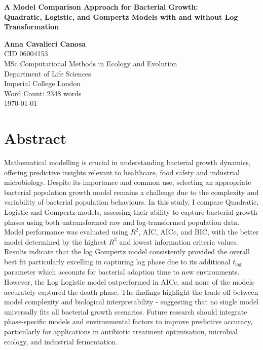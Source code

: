 \documentclass[11pt]{article}
\begin{document}
\begin{titlepage}
    \centering
    \vspace*{0.3in}
    \begin{spacing}{3}
         {\LARGE \bf 
    A Model Comparison Approach for Bacterial Growth: \\ Quadratic, Logistic, and Gompertz Models with and without Log Transformation}\\[0.5in]
    \end{spacing}
    
    \textbf{Anna Cavalieri Canosa}\\
    CID 06004153\\[1in] 
    MSc Computational Methods in Ecology and Evolution\\
    Department of Life Sciences\\
    Imperial College London\\[1in]
    Word Count: 2348 words\\[1in]
    \today
\end{titlepage}

\section*{Abstract}
Mathematical modelling is crucial in understanding bacterial growth dynamics, offering predictive insights relevant to healthcare, food safety and industrial microbiology. Despite its importance and common use, selecting an appropriate bacterial population growth model remains a challenge due to the complexity and variability of bacterial population behaviours. In this study, I compare Quadratic, Logistic and Gompertz models, assessing their ability to capture bacterial growth phases using both untransformed raw and log-transformed population data. Model performance was evaluated using $R^2$, AIC, AICc, and BIC, with the better model determined by the highest $R^2$ and lowest information criteria values. Results indicate that the log Gompertz model consistently provided the overall best fit particularly excelling in capturing lag phase due to its additional $t_{\text{lag}}$ parameter which accounts for bacterial adaption time to new environments. However, the Log Logistic model outperformed in AICc, and none of the models accurately captured the death phase. The findings highlight the trade-off between model complexity and biological interpretability - suggesting that no single model universally fits all bacterial growth scenarios. Future research should integrate phase-specific models and environmental factors to improve predictive accuracy, particularly for applications in antibiotic treatment optimisation, microbial ecology, and industrial fermentation.
\newpage
\end{document}
